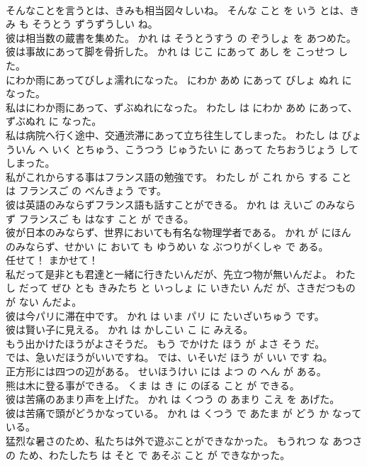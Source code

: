 \documentclass[8pt]{extreport}
\begin{document}
\begin{CJK}{UTF8}{min}
\\	そんなことを言うとは、きみも相当図々しいね。	そんな こと を いう とは、きみ も そうとう ずうずうしい ね。	
\\	彼は相当数の蔵書を集めた。	かれ は そうとうすう の ぞうしょ を あつめた。	
\\	彼は事故にあって脚を骨折した。	かれ は じこ にあって あし を こっせつ した。	
\\	にわか雨にあってびしょ濡れになった。	にわか あめ にあって びしょ ぬれ に なった。	
\\	私はにわか雨にあって、ずぶぬれになった。	わたし は にわか あめ にあって、ずぶぬれ に なった。	
\\	私は病院へ行く途中、交通渋滞にあって立ち往生してしまった。	わたし は びょういん へ いく とちゅう、こうつう じゅうたい に あって たちおうじょう して しまった。	
\\	私がこれからする事はフランス語の勉強です。	わたし が これ から する こと は フランスご の べんきょう です。	
\\	彼は英語のみならずフランス語も話すことができる。	かれ は えいご のみならず フランスご も はなす こと が できる。	
\\	彼が日本のみならず、世界においても有名な物理学者である。	かれ が にほん のみならず、せかい に おいて も ゆうめい な ぶつりがくしゃ で ある。	
\\	任せて！	まかせて！	
\\	私だって是非とも君達と一緒に行きたいんだが、先立つ物が無いんだよ。	わたし だって ぜひ とも きみたち と いっしょ に いきたい んだ が、さきだつもの が ない んだよ。	
\\	彼は今パリに滞在中です。	かれ は いま パリ に たいざいちゅう です。	
\\	彼は賢い子に見える。	かれ は かしこい こ に みえる。	
\\	もう出かけたほうがよさそうだ。	もう でかけた ほう が よさ そう だ。	
\\	では、急いだほうがいいですね。	では、いそいだ ほう が いい です ね。	
\\	正方形には四つの辺がある。	せいほうけい には よつ の へん が ある。	
\\	熊は木に登る事ができる。	くま は き に のぼる こと が できる。	
\\	彼は苦痛のあまり声を上げた。	かれ は くつう の あまり こえ を あげた。	
\\	彼は苦痛で頭がどうかなっている。	かれ は くつう で あたま が どう か なっている。	
\\	猛烈な暑さのため、私たちは外で遊ぶことができなかった。	もうれつ な あつさ の ため、わたしたち は そと で あそぶ こと が できなかった。	

\end{CJK}
\end{document}
